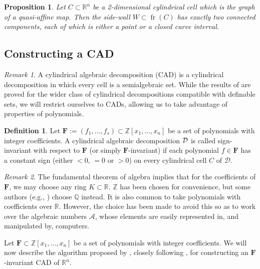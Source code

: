 \documentclass[
]{book}
\newtheorem{proposition}{Proposition}[chapter]
\theoremstyle{definition}
\newtheorem{definition}{Definition}[chapter]
\theoremstyle{definition}
\theoremstyle{definition}
\theoremstyle{definition}
\theoremstyle{remark}
\newtheorem*{remark}{Remark}
\begin{document}
\begin{proposition}
\citep[Lemma 3.4]{bgv15}
Let \(C \subset \mathbb{R}^n\) be a 2-dimensional cylindrical cell which is the graph of a quasi-affine map. Then the side-wall \(W \subset {\operatorname{fr} \left( C \right)}\) has exactly two connected components, each of which is either a point or a closed curve interval.
\end{proposition}

\hypertarget{sec:cad-construction}{%
\subsection{Constructing a CAD}\label{sec:cad-construction}}

\begin{remark}
A cylindrical algebraic decomposition (CAD) is a cylindrical decomposition in which every cell is a semialgebraic set. While the results of \citet{bgv15} are proved for the wider class of cylindrical decompositions compatible with definable sets, we will restrict ourselves to CADs, allowing us to take advantage of properties of polynomials.
\end{remark}

\begin{definition}
Let \(\mathbf{F} := (f_1,\ldots,f_s) \subset \mathbb{Z}[x_1,\ldots,x_n]\) be a set of polynomials with integer coefficients. A cylindrical algebraic decomposition \(\cal D\) is called sign-invariant with respect to \(\mathbf{F}\) (or simply \(\mathbf{F}\)-invariant) if each polynomial \(f \in \mathbf{F}\) has a constant sign (either \(< 0\), \(= 0\) or \(> 0\)) on every cylindrical cell \(C\) of \(\mathcal{D}\).
\end{definition}

\begin{remark}
The fundamental theorem of algebra implies that for the coefficients of \(\mathbf{F}\), we may choose any ring \(K \subset \mathbb{R}\). \(\mathbb{Z}\) has been chosen for convenience, but some authors (e.g., \citet{pianomovers1983}) choose \(\mathbb{Q}\) instead. It is also common to take polynomials with coefficients over \(\mathbb{R}\). However, the choice has been made to avoid this so as to work over the algebraic numbers \(\mathcal{A}\), whose elements are easily represented in, and manipulated by, computers.
\end{remark}

Let \(\mathbf{F} \subset \mathbb{Z}[x_1,\ldots,x_n]\) be a set of polynomials with integer coefficients. We will now describe the algorithm proposed by \citet{collins1975}, closely following \citet{coste2000}, for constructing an \(\mathbf{F}\)-invariant CAD of \(\mathbb{R}^n\).
\end{document}
